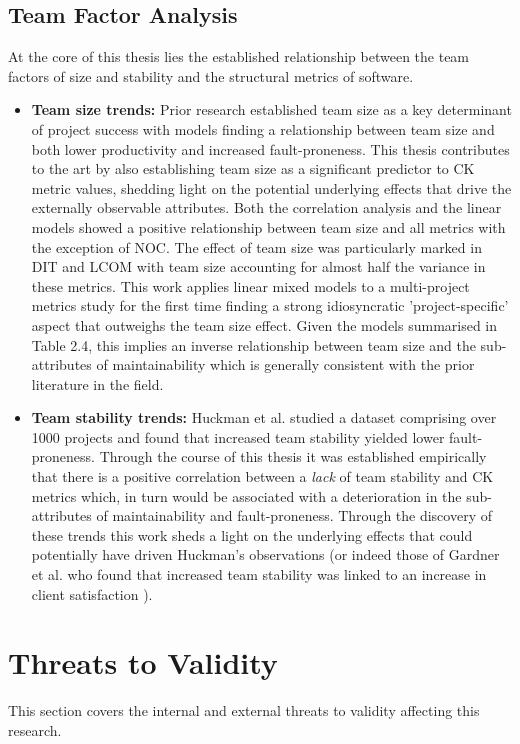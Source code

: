 \subsection{Team Factor Analysis}
At the core of this thesis lies the established relationship between the team factors of size and stability and the structural metrics of software.

\begin{itemize}
\item  \textbf{Team size trends: } Prior research established team size as a key determinant of project success with models finding a relationship between team size and both lower productivity and increased fault-proneness. This thesis contributes to the art by also establishing team size as a significant predictor to CK metric values, shedding light on the potential underlying effects that drive the externally observable attributes. Both the correlation analysis and the linear models showed a positive relationship between team size and all metrics with the exception of NOC. The effect of team size was particularly marked in DIT and LCOM with team size accounting for almost half the variance in these metrics. This work applies linear mixed models to a multi-project metrics study for the first time finding a strong idiosyncratic 'project-specific' aspect that outweighs the team size effect. Given the models summarised in Table 2.4, this implies an inverse relationship between team size and the sub-attributes of maintainability which is generally consistent with the prior literature in the field. 

\item  \textbf{Team stability trends: } Huckman et al. studied a dataset comprising over 1000 projects and found that increased team stability yielded lower fault-proneness. Through the course of this thesis it was established empirically that there is a positive correlation between a \textit{lack} of team stability and CK metrics which, in turn would be associated with a deterioration in the sub-attributes of maintainability and fault-proneness. Through the discovery of these trends this work sheds a light on the underlying effects that could potentially have driven Huckman's observations (or indeed those of Gardner et al. who found that increased team stability was linked to an increase in client satisfaction \citep{gardner2012dynamically}).
\end{itemize}

\section{Threats to Validity} %
This section covers the internal and external threats to validity affecting this research.

